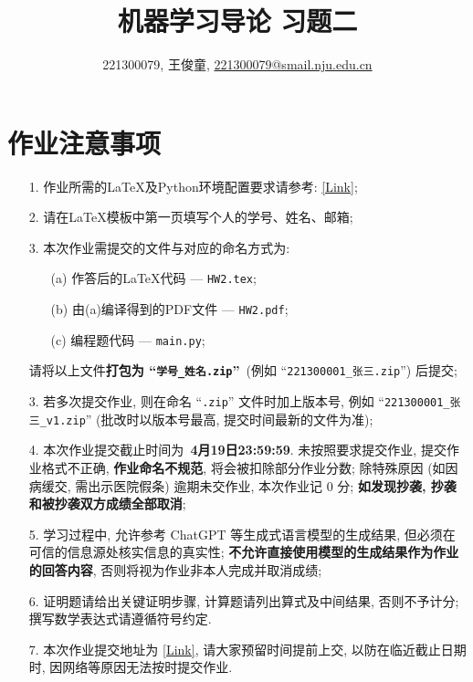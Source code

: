 \documentclass[a4paper]{article}
\numberwithin{equation}{section}
\theoremstyle{definition}
\begin{document}
\title{机器学习导论 习题二}
\author{221300079, 王俊童, \href{mailto:221300079@smail.nju.edu.cn}{221300079@smail.nju.edu.cn}}
\maketitle

\section*{作业注意事项}

\begin{tcolorbox}
	\begin{enumerate}
		\item[1.] 作业所需的LaTeX及Python环境配置要求请参考: \href{https://www.lamda.nju.edu.cn/ML2024Spring/supplementary/environment.pdf}{[Link]};
		\item[2.] 请在LaTeX模板中第一页填写个人的学号、姓名、邮箱;
		\item[3.] 本次作业需提交的文件与对应的命名方式为:
		      \begin{enumerate}
			      \item [(a)] 作答后的LaTeX代码 --- \texttt{HW2.tex};
			      \item [(b)] 由(a)编译得到的PDF文件 --- \texttt{HW2.pdf};
			      \item [(c)] 编程题代码 --- \texttt{main.py};
		      \end{enumerate}
		      请将以上文件{\color{red}\textbf{打包为 ``\texttt{学号\hspace{0em}\_\hspace{0em}姓名.zip}''}}~(例如 ``\texttt{221300001\_\hspace{0em}张三.zip}'') 后提交;
		\item[3.] 若多次提交作业, 则在命名 ``\texttt{.zip}'' 文件时加上版本号, 例如 ``\texttt{221300001\_\hspace{0em}张三\hspace{0em}\_v1.zip}'' (批改时以版本号最高, 提交时间最新的文件为准);
		\item[4.] 本次作业提交截止时间为~{\color{red}\textbf{{4}月{19}日{23:59:59}}}. 未按照要求提交作业, 提交作业格式不正确, {\color{red}\textbf{作业命名不规范}}, 将会被扣除部分作业分数; 除特殊原因 (如因病缓交, 需出示医院假条) 逾期未交作业, 本次作业记 0 分; {\color{red}\textbf{如发现抄袭, 抄袭和被抄袭双方成绩全部取消}};
		\item[5.] 学习过程中, 允许参考 ChatGPT 等生成式语言模型的生成结果, 但必须在可信的信息源处核实信息的真实性; {\color{red}\textbf{不允许直接使用模型的生成结果作为作业的回答内容}}, 否则将视为作业非本人完成并取消成绩;
		\item[6.] 证明题请给出关键证明步骤, 计算题请列出算式及中间结果, 否则不予计分; 撰写数学表达式请遵循符号约定.
		\item[7.] 本次作业提交地址为 \href{https://box.nju.edu.cn/u/d/a84222be492048779a27/}{[Link]}, 请大家预留时间提前上交, 以防在临近截止日期时, 因网络等原因无法按时提交作业.
	\end{enumerate}
\end{tcolorbox}
\end{document}
